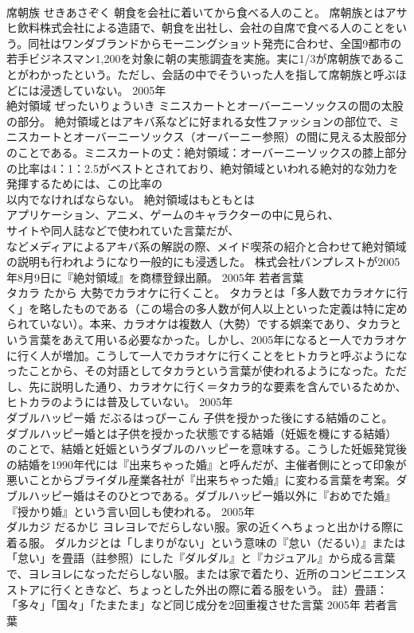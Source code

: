 \documentclass[8pt]{extreport}
\begin{document}
\begin{CJK}{UTF8}{min}
\\	席朝族	せきあさぞく	朝食を会社に着いてから食べる人のこと。	席朝族とはアサヒ飲料株式会社による造語で、朝食を出社し、会社の自席で食べる人のことをいう。同社はワンダブランドからモーニングショット発売に合わせ、全国9都市の若手ビジネスマン1,200を対象に朝の実態調査を実施。実に1/3が席朝族であることがわかったという。ただし、会話の中でそういった人を指して席朝族と呼ぶほどには浸透していない。	2005年	
\\	絶対領域	ぜったいりょういき	ミニスカートとオーバーニーソックスの間の太股の部分。	絶対領域とはアキバ系などに好まれる女性ファッションの部位で、ミニスカートとオーバーニーソックス（オーバーニー参照）の間に見える太股部分のことである。ミニスカートの丈：絶対領域：オーバーニーソックスの膝上部分の比率は4：1：2.5がベストとされており、絶対領域といわれる絶対的な効力を発揮するためには、この比率の
\\	以内でなければならない。 絶対領域はもともとは
\\	アプリケーション、アニメ、ゲームのキャラクターの中に見られ、
\\	サイトや同人誌などで使われていた言葉だが、
\\	などメディアによるアキバ系の解説の際、メイド喫茶の紹介と合わせて絶対領域の説明も行われようになり一般的にも浸透した。 株式会社バンプレストが2005年8月9日に『絶対領域』を商標登録出願。	2005年	若者言葉	
\\	タカラ	たから	大勢でカラオケに行くこと。	タカラとは「多人数でカラオケに行く」を略したものである（この場合の多人数が何人以上といった定義は特に定められていない）。本来、カラオケは複数人（大勢）でする娯楽であり、タカラという言葉をあえて用いる必要なかった。しかし、2005年になると一人でカラオケに行く人が増加。こうして一人でカラオケに行くことをヒトカラと呼ぶようになったことから、その対語としてタカラという言葉が使われるようになった。ただし、先に説明した通り、カラオケに行く＝タカラ的な要素を含んでいるためか、ヒトカラのようには普及していない。	2005年	
\\	ダブルハッピー婚	だぶるはっぴーこん	子供を授かった後にする結婚のこと。	ダブルハッピー婚とは子供を授かった状態でする結婚（妊娠を機にする結婚）のことで、結婚と妊娠というダブルのハッピーを意味する。こうした妊娠発覚後の結婚を1990年代には『出来ちゃった婚』と呼んだが、主催者側にとって印象が悪いことからブライダル産業各社が『出来ちゃった婚』に変わる言葉を考案。ダブルハッピー婚はそのひとつである。ダブルハッピー婚以外に『おめでた婚』『授かり婚』という言い回しも使われる。	2005年	
\\	ダルカジ	だるかじ	ヨレヨレでだらしない服。家の近くへちょっと出かける際に着る服。	ダルカジとは「しまりがない」という意味の『怠い（だるい）』または「怠い」を畳語（註参照）にした『ダルダル』と『カジュアル』から成る言葉で、ヨレヨレになっただらしない服。または家で着たり、近所のコンビニエンスストアに行くときなど、ちょっとした外出の際に着る服をいう。 註）畳語：「多々」「国々」「たまたま」など同じ成分を2回重複させた言葉	2005年	若者言葉	

\end{CJK}
\end{document}
